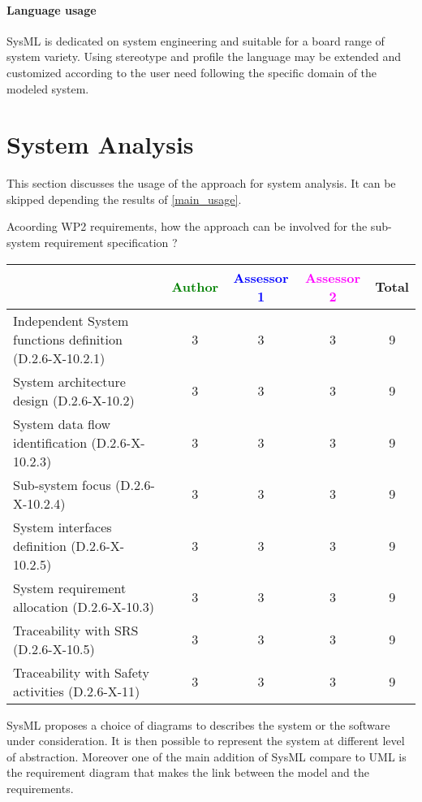 \paragraph{Language usage} 
SysML is dedicated on system engineering and suitable for a board range of
system variety. Using stereotype and profile the language may be
extended and customized according to the user need following the
specific domain of the modeled system.


\section{System Analysis}
This section discusses the usage of the approach for system analysis.
It can be skipped depending the results of \ref{main_usage}.

Acoording WP2 requirements, how the approach can be involved for the sub-system requirement specification ?

\begin{tabular}{|l | c | c | c | c|}
\hline
& \textcolor{green}{Author} & \textcolor{blue}{Assessor 1} & \textcolor{magenta}{Assessor 2} & Total \\
\hline
Independent System functions definition (D.2.6-X-10.2.1)  &3 & 3& 3 & 9 \\
\hline 
System architecture design (D.2.6-X-10.2) &3 & 3& 3& 9 \\
\hline
System data flow identification (D.2.6-X-10.2.3)  &3 & 3& 3& 9 \\
\hline
Sub-system focus (D.2.6-X-10.2.4)  &3 & 3& 3& 9 \\
\hline
System interfaces definition (D.2.6-X-10.2.5)  &3 & 3& 3& 9 \\
\hline
System requirement allocation (D.2.6-X-10.3)  &3 & 3& 3& 9  \\
\hline
Traceability with SRS (D.2.6-X-10.5)  &3 & 3& 3& 9  \\
\hline
Traceability with Safety activities (D.2.6-X-11)  &3 & 3& 3& 9 \\
\hline
\end{tabular}
\begin{author_comment}
  SysML proposes a choice of diagrams to describes the system or the
  software under consideration. It is then possible to represent the
  system at different level of abstraction. Moreover one of the main
  addition of SysML compare to UML is the requirement diagram that
  makes the link between the model and the requirements.
\end{author_comment}


